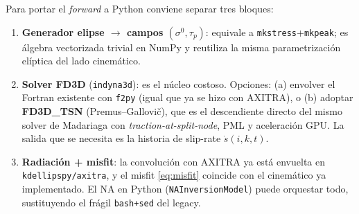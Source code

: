 \documentclass[11pt,a4paper]{article}
\begin{document}
Para portar el \emph{forward} a Python conviene separar tres bloques:
\begin{enumerate}
  \item \textbf{Generador elipse $\to$ campos $(\sigma^0,\tau_p)$}: equivale a
        \texttt{mkstress}+\texttt{mkpeak}; es álgebra vectorizada trivial en
        NumPy y reutiliza la misma parametrización elíptica del lado cinemático.
  \item \textbf{Solver FD3D} (\texttt{indyna3d}): es el núcleo costoso. Opciones:
        (a) envolver el Fortran existente con \texttt{f2py} (igual que ya se hizo
        con AXITRA), o (b) adoptar \textbf{FD3D\_TSN} (Premus--Gallovič), que es
        el descendiente directo del mismo solver de Madariaga con
        \emph{traction-at-split-node}, PML y aceleración GPU. La salida que se
        necesita es la historia de slip-rate $\dot{s}(i,k,t)$.
  \item \textbf{Radiación + misfit}: la convolución con AXITRA ya está envuelta
        en \texttt{kdellipspy/axitra}, y el misfit \eqref{eq:misfit} coincide con
        el cinemático ya implementado. El NA en Python (\texttt{NAInversionModel})
        puede orquestar todo, sustituyendo el frágil \texttt{bash+sed} del legacy.
\end{enumerate}
\end{document}
